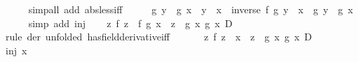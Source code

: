 \begin{isabellebody}
\ \ \ \ \isamarkupfalse%
\ {\isacharparenleft}{\kern0pt}simp{\isacharunderscore}{\kern0pt}all\ add{\isacharcolon}{\kern0pt}\ abs{\isacharunderscore}{\kern0pt}less{\isacharunderscore}{\kern0pt}iff{\isacharparenright}{\kern0pt}\isanewline
\ \ \isamarkupfalse%
\ \isamarkupfalse%
\ {\isachardoublequoteopen}{\isacharparenleft}{\kern0pt}g\ y\ {\isacharminus}{\kern0pt}\ g\ x{\isacharparenright}{\kern0pt}\ {\isacharslash}{\kern0pt}\ {\isacharparenleft}{\kern0pt}y\ {\isacharminus}{\kern0pt}\ x{\isacharparenright}{\kern0pt}\ {\isacharequal}{\kern0pt}\ inverse\ {\isacharparenleft}{\kern0pt}{\isacharparenleft}{\kern0pt}f\ {\isacharparenleft}{\kern0pt}g\ y{\isacharparenright}{\kern0pt}\ {\isacharminus}{\kern0pt}\ x{\isacharparenright}{\kern0pt}\ {\isacharslash}{\kern0pt}\ {\isacharparenleft}{\kern0pt}g\ y\ {\isacharminus}{\kern0pt}\ g\ x{\isacharparenright}{\kern0pt}{\isacharparenright}{\kern0pt}{\isachardoublequoteclose}\isanewline
\ \ \ \ \isamarkupfalse%
\ {\isacharparenleft}{\kern0pt}simp\ add{\isacharcolon}{\kern0pt}\ inj{\isacharparenright}{\kern0pt}\isanewline
{}\isamarkupfalse%
\isanewline
\ \ \isamarkupfalse%
\ {\isachardoublequoteopen}{\isacharparenleft}{\kern0pt}{\isasymlambda}z{\isachardot}{\kern0pt}\ {\isacharparenleft}{\kern0pt}f\ z\ {\isacharminus}{\kern0pt}\ f\ {\isacharparenleft}{\kern0pt}g\ x{\isacharparenright}{\kern0pt}{\isacharparenright}{\kern0pt}\ {\isacharslash}{\kern0pt}\ {\isacharparenleft}{\kern0pt}z\ {\isacharminus}{\kern0pt}\ g\ x{\isacharparenright}{\kern0pt}{\isacharparenright}{\kern0pt}\ {\isasymmidarrow}g\ x{\isasymrightarrow}\ D{\isachardoublequoteclose}\isanewline
\ \ \ \ \isamarkupfalse%
\ {\isacharparenleft}{\kern0pt}rule\ der\ {\isacharbrackleft}{\kern0pt}unfolded\ has{\isacharunderscore}{\kern0pt}field{\isacharunderscore}{\kern0pt}derivative{\isacharunderscore}{\kern0pt}iff{\isacharbrackright}{\kern0pt}{\isacharparenright}{\kern0pt}\isanewline
\ \ \isamarkupfalse%
\ \isamarkupfalse%
\ {}{\isacharcolon}{\kern0pt}\ {\isachardoublequoteopen}{\isacharparenleft}{\kern0pt}{\isasymlambda}z{\isachardot}{\kern0pt}\ {\isacharparenleft}{\kern0pt}f\ z\ {\isacharminus}{\kern0pt}\ x{\isacharparenright}{\kern0pt}\ {\isacharslash}{\kern0pt}\ {\isacharparenleft}{\kern0pt}z\ {\isacharminus}{\kern0pt}\ g\ x{\isacharparenright}{\kern0pt}{\isacharparenright}{\kern0pt}\ {\isasymmidarrow}g\ x{\isasymrightarrow}\ D{\isachardoublequoteclose}\isanewline
\ \ \ \ \isamarkupfalse%
\ inj\ x\ \isamarkupfalse%

\end{isabellebody}
